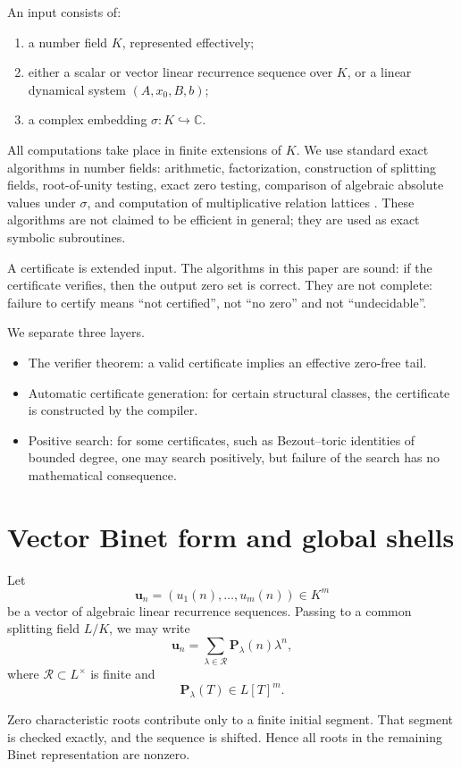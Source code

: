 \documentclass[11pt]{article}
\newcommand{\C}{\mathbb C}
\begin{document}
An input consists of:
\begin{enumerate}
\item a number field \(K\), represented effectively;
\item either a scalar or vector linear recurrence sequence over \(K\), or a linear dynamical system \((A,x_0,B,b)\);
\item a complex embedding \(\sigma:K\hookrightarrow \C\).
\end{enumerate}

All computations take place in finite extensions of \(K\). We use standard exact algorithms in number fields: arithmetic, factorization, construction of splitting fields, root-of-unity testing, exact zero testing, comparison of algebraic absolute values under \(\sigma\), and computation of multiplicative relation lattices \cite{Ge}. These algorithms are not claimed to be efficient in general; they are used as exact symbolic subroutines.

A certificate is extended input. The algorithms in this paper are sound: if the certificate verifies, then the output zero set is correct. They are not complete: failure to certify means ``not certified'', not ``no zero'' and not ``undecidable''.

We separate three layers.
\begin{itemize}
\item The verifier theorem: a valid certificate implies an effective zero-free tail.
\item Automatic certificate generation: for certain structural classes, the certificate is constructed by the compiler.
\item Positive search: for some certificates, such as Bezout--toric identities of bounded degree, one may search positively, but failure of the search has no mathematical consequence.
\end{itemize}

\section{Vector Binet form and global shells}

Let
\[
\mathbf u_n=(u_1(n),\ldots,u_m(n))\in K^m
\]
be a vector of algebraic linear recurrence sequences. Passing to a common splitting field \(L/K\), we may write
\[
\mathbf u_n=\sum_{\lambda\in\mathcal R}\mathbf P_\lambda(n)\lambda^n,
\]
where \(\mathcal R\subset L^\times\) is finite and
\[
\mathbf P_\lambda(T)\in L[T]^m.
\]

Zero characteristic roots contribute only to a finite initial segment. That segment is checked exactly, and the sequence is shifted. Hence all roots in the remaining Binet representation are nonzero.
\end{document}
